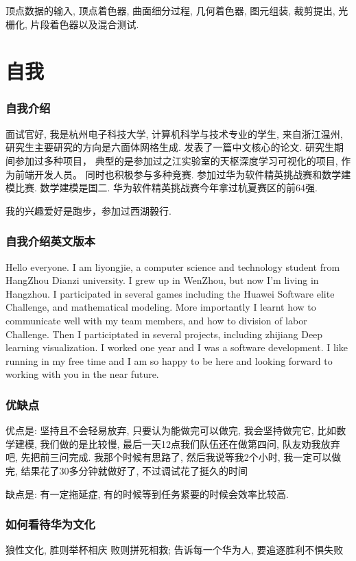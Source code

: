 \documentclass[UTF8]{ctexart}
\begin{document}
顶点数据的输入, 顶点着色器, 曲面细分过程, 几何着色器, 图元组装, 裁剪提出, 光栅化, 片段着色器以及混合测试.

\section{自我}
\subsubsection{自我介绍}
面试官好, 我是杭州电子科技大学, 计算机科学与技术专业的学生, 来自浙江温州,
研究生主要研究的方向是六面体网格生成. 发表了一篇中文核心的论文.
研究生期间参加过多种项目， 典型的是参加过之江实验室的天枢深度学习可视化的项目, 作为前端开发人员。
同时也积极参与多种竞赛. 参加过华为软件精英挑战赛和数学建模比赛. 数学建模是国二. 华为软件精英挑战赛今年拿过杭夏赛区的前64强. \par
我的兴趣爱好是跑步，参加过西湖毅行.
\subsubsection{自我介绍英文版本}
Hello everyone. I am liyongjie, a computer science and technology student from HangZhou Dianzi university. I grew up in WenZhou, but now I'm living in Hangzhou. I participated in several games including the Huawei Software elite Challenge, and mathematical modeling. More importantly I learnt how to communicate well with my team members, and how to division of labor Challenge. Then I participtated in several projects, including zhijiang Deep learning visualization. I worked one year and I was a software development. I like running in my free time and I am so happy to be here and looking forward to working with you in the near future.

\subsubsection{优缺点}
优点是: 坚持且不会轻易放弃, 只要认为能做完可以做完, 我会坚持做完它, 比如数学建模, 我们做的是比较慢, 最后一天12点我们队伍还在做第四问, 队友劝我放弃吧, 先把前三问完成. 我那个时候有思路了, 然后我说等我2个小时, 我一定可以做完, 结果花了30多分钟就做好了, 不过调试花了挺久的时间

缺点是: 有一定拖延症, 有的时候等到任务紧要的时候会效率比较高.

\subsubsection{如何看待华为文化}
狼性文化, 胜则举杯相庆 败则拼死相救; 告诉每一个华为人, 要追逐胜利不惧失败
\end{document}
